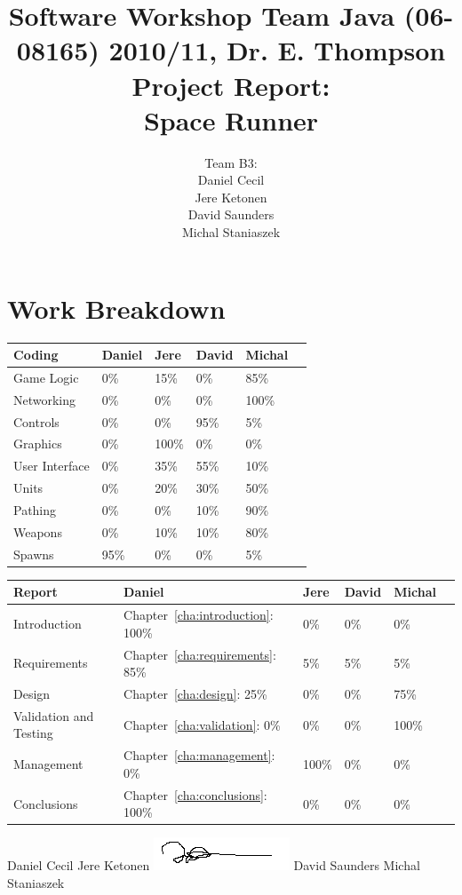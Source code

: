 \documentclass[10pt]{report}
\title{
{\normalsize Software Workshop Team Java (06-08165) 2010/11, Dr. E. Thompson}\\[2cm]
Project Report:\\
Space Runner
}
\author{Team B3:\\
Daniel Cecil\\
Jere Ketonen\\
David Saunders\\
Michal Staniaszek
}
\begin{document}
\maketitle
\tableofcontents
\chapter*{Work Breakdown}
\label{work-breakdown}

\thispagestyle{empty}

\begin{center}
  \begin{tabular}{|l||l|l|l|l|l|}\hline
    \textbf{Coding} & \textbf{Daniel} & \textbf{Jere} & \textbf{David}
    & \textbf{Michal} \\\hline\hline
    Game Logic &  0\% & 15\% & 0\% & 85\%\\\hline
    Networking &  0\% & 0\% & 0\% & 100\%\\\hline
    Controls &  0\% & 0\% & 95\% & 5\%\\\hline
    Graphics &  0\% & 100\% & 0\% & 0\%\\\hline
    User Interface &  0\% & 35\% & 55\% & 10\%\\\hline
    Units &  0\% & 20\% & 30\% & 50\%\\\hline
    Pathing &  0\% & 0\% & 10\% & 90\%\\\hline
    Weapons &  0\% & 10\% & 10\% & 80\%\\\hline
    Spawns &  95\% & 0\% & 0\% & 5\%\\\hline
  \end{tabular}\vspace*{1cm}

  \begin{tabular}{|l||l|l|l|l|l|}\hline
    \textbf{Report} & \textbf{Daniel} & \textbf{Jere} & \textbf{David}
    & \textbf{Michal}\\\hline\hline
    Introduction & Chapter~\ref{cha:introduction}: 100\% & 0\% & 0\% & 0\%\\\hline
    Requirements & Chapter~\ref{cha:requirements}: 85\% & 5\% & 5\% & 5\%\\\hline
    Design & Chapter~\ref{cha:design}: 25\% & 0\% & 0\% & 75\%\\\hline
    Validation and Testing & Chapter~\ref{cha:validation}: 0\% & 0\% & 0\% & 100\%\\\hline
    Management & Chapter~\ref{cha:management}: 0\% & 100\% & 0\% & 0\%\\\hline
    Conclusions & Chapter~\ref{cha:conclusions}: 100\% & 0\% & 0\% & 0\%\\\hline
  \end{tabular}\vskip 1cm

  Daniel Cecil \vskip 1.4cm
  Jere Ketonen \vskip 0.1cm
  \includegraphics{jeresign.png}\vskip 0.2cm
  David Saunders \vskip 1.4cm
  Michal Staniaszek
  \end{center}
\end{document}
